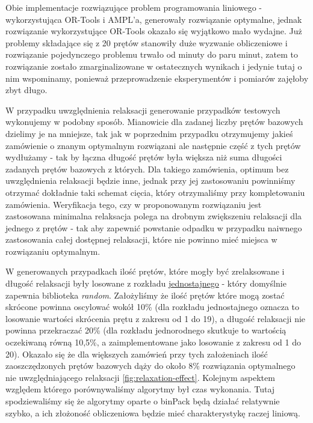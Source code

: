  Obie implementacje rozwiązujące problem programowania liniowego - wykorzystująca OR-Tools i AMPL'a, generowały rozwiązanie optymalne, jednak rozwiązanie wykorzystujące OR-Tools okazało się wyjątkowo mało wydajne. Już problemy składające się z 20 prętów stanowiły duże wyzwanie obliczeniowe i rozwiązanie pojedynczego problemu trwało od minuty do paru minut, zatem to rozwiązanie zostało zmarginalizowane w ostatecznych wynikach i jedynie tutaj o nim wspominamy, ponieważ przeprowadzenie eksperymentów i pomiarów zajęłoby zbyt długo.

W przypadku uwzględnienia relaksacji generowanie przypadków testowych wykonujemy w podobny sposób. Mianowicie dla zadanej liczby prętów bazowych dzielimy je na mniejsze, tak jak w poprzednim przypadku otrzymujemy jakieś zamówienie o znanym optymalnym rozwiązani ale następnie część z tych prętów wydłużamy - tak by łączna długość prętów była większa niż suma długości zadanych prętów bazowych z których. Dla takiego zamówienia, optimum bez uwzględnienia relaksacji będzie inne, jednak przy jej zastosowaniu powinniśmy otrzymać dokładnie taki schemat cięcia, który otrzymaliśmy przy kompletowaniu zamówienia. Weryfikacja tego, czy w proponowanym rozwiązaniu jest zastosowana minimalna relaksacja polega na drobnym zwiększeniu relaksacji dla jednego z prętów - tak aby zapewnić powstanie odpadku w przypadku naiwnego zastosowania całej dostępnej relaksacji, które nie powinno mieć miejsca w rozwiązaniu optymalnym.

W generowanych przypadkach ilość prętów, które mogły być zrelaksowane i długość relaksacji były losowane z rozkładu \href{https://docs.python.org/3/library/random.html}{jednostajnego} - który domyślnie zapewnia biblioteka \textit{random}. Założyliśmy że ilość prętów które mogą zostać skrócone powinna oscylować wokół 10\% (dla rozkładu jednostajnego oznacza to losowanie wartości skrócenia prętu z zakresu od 1 do 19), a długość relaksacji nie powinna przekraczać 20\% (dla rozkładu jednorodnego skutkuje to wartością oczekiwaną równą 10,5\%, a zaimplementowane jako losowanie z zakresu od 1 do 20). Okazało się że dla większych zamówień przy tych założeniach ilość zaoszczędzonych prętów bazowych dąży do około 8\% rozwiązania optymalnego nie uwzględniającego relaksacji \ref{fig:relaxation-effect}. Kolejnym aspektem względem którego porównywaliśmy algorytmy był czas wykonania. Tutaj spodziewaliśmy się że algorytmy oparte o binPack będą działać relatywnie szybko, a ich złożoność obliczeniowa będzie mieć charakterystykę raczej liniową.

